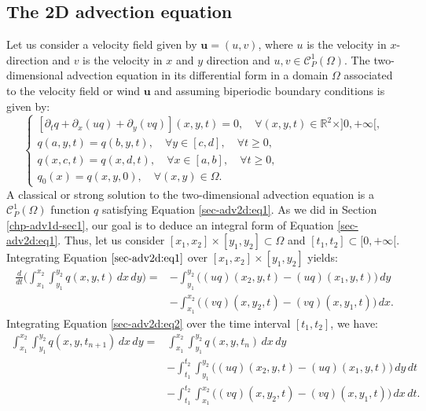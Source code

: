 \subsection{The 2D advection equation}
Let us consider a  velocity field given by $\boldsymbol{u}=(u,v)$, where
$u$ is the velocity in $x$-direction and $v$ is the velocity in $x$ and $y$ direction
and $u,v \in \mathcal{C}^1_P(\Omega)$.
The two-dimensional advection equation in its differential form in 
a domain $\Omega$ associated to the velocity field or wind $\boldsymbol{u}$ 
and assuming biperiodic boundary conditions is given by:
\begin{equation}
	\label{sec-adv2d:eq1}
	\begin{cases}
		[{\partial_t q} + {\partial_x (uq)} +  {\partial_y (vq)}](x, y, t)
		= 0, \quad \forall (x,y,t) \in \mathbb{R}^2\times ]0, +\infty[,\\
		{q}(a, y, t) = {q}(b, y, t), \quad \forall y \in [c,d],  \quad \forall t\geq 0, \\
		{q}(x, c, t) = {q}(x, d, t), \quad \forall x \in [a,b],  \quad \forall t\geq 0, \\
		q_0(x) = q(x,y,0), \quad \forall (x,y) \in \Omega.
	\end{cases}
\end{equation} 
A classical or strong solution to the two-dimensional advection equation is a 
$\mathcal{C}^1_P{(\Omega)}$ function ${q}$ satisfying Equation \eqref{sec-adv2d:eq1}.
As we did in Section \ref{chp-adv1d-sec1}, our goal is to deduce an
integral form of Equation \eqref{sec-adv2d:eq1}.
Thus, let us consider  $[x_1,x_2] \times [y_1, y_2]
\subset \Omega$ and $[t_1,t_2] \subset [0, +\infty[$.
Integrating Equation $\eqref{sec-adv2d:eq1}$ over 
$[x_1,x_2] \times [y_1, y_2]$ yields:
\begin{align}
	\label{sec-adv2d:eq2}
	\frac{d}{d t} \bigg(\int_{x_1}^{x_2} \int_{y_1}^{y_2}
	{q}(x, y, t) \,dx \,dy \bigg)=
	&-\int_{y_1}^{y_2} \bigg({(uq)}(x_2, y, t)
	-{(uq)}(x_1, y, t) \bigg) \,dy \\ \nonumber
	&-\int_{x_1}^{x_2} \bigg({(vq)}(x, y_2, t)
	-{(vq)}(x, y_1, t) \bigg) \,dx.
\end{align}
Integrating Equation \eqref{sec-adv2d:eq2} over the time interval $[t_1,t_2]$, 
we have:
\begin{align}
	\label{sec-adv2d:eq3}
	\int_{x_1}^{x_2} \int_{y_1}^{y_2}
	{q}(x, y, t_{n+1}) \,dx \,dy = &\int_{x_1}^{x_2} \int_{y_1}^{y_2}
	{q}(x, y, t_n) \,dx \,dy \\ \nonumber
	&-\int_{t_1}^{t_2} \int_{y_1}^{y_2} \bigg({(uq)}(x_2, y, t)
	-{(uq)}(x_1, y, t) \bigg) \,dy \,dt\\ \nonumber
	&-\int_{t_1}^{t_2} \int_{x_1}^{x_2} \bigg({(vq)}(x, y_2, t)
	-{(vq)}(x, y_1, t) \bigg) \,dx \,dt.
\end{align}
